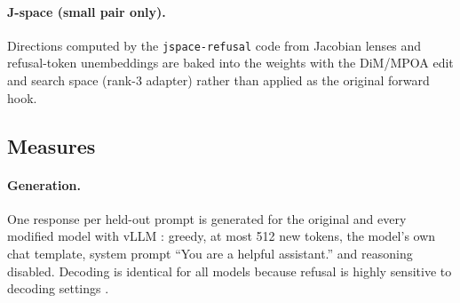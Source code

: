 \paragraph{J-space (small pair only).} Directions computed by the
\texttt{jspace-refusal} code from Jacobian lenses and refusal-token
unembeddings
\cite{sekinal2026jspace,neuronpedia2026jacobian,gurnee2026verbalizable} are
baked into the weights with the DiM/MPOA edit and search space (rank-3 adapter)
rather than applied as the original forward hook.

\subsection{Measures}
\label{sec:setup-eval}

\paragraph{Generation.} One response per held-out prompt is generated for the
original and every modified model with vLLM \cite{kwon2023efficient}:
greedy, at most 512 new tokens, the model's own chat template, system prompt
``You are a helpful assistant.'' and reasoning disabled. Decoding is
identical for all models because refusal is highly sensitive to decoding
settings \cite{huang2024catastrophic}.

